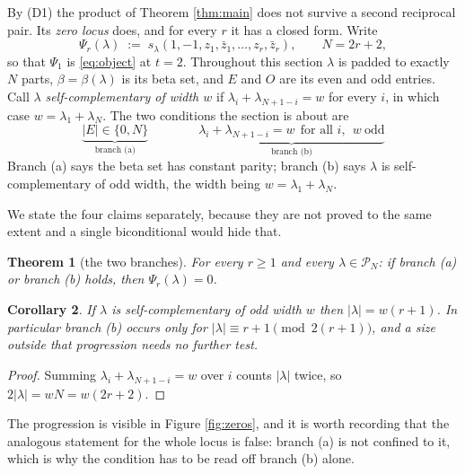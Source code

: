 \documentclass[11pt,reqno]{amsart}
\theoremstyle{plain}
\newtheorem{theorem}{Theorem}[section]
\newtheorem{corollary}[theorem]{Corollary}
\theoremstyle{definition}
\newcommand{\PP}{\mathcal{P}}
\begin{document}
By (D1) the product of Theorem \ref{thm:main} does not survive a second reciprocal pair. Its
\emph{zero locus} does, and for every $r$ it has a closed form. Write
\begin{equation}\label{eq:psir}
\Psi_r(\lambda)\;:=\;s_\lambda(1,-1,z_1,\bar z_1,\dots,z_r,\bar z_r),\qquad N=2r+2,
\end{equation}
so that $\Psi_1$ is \eqref{eq:object} at $t=2$. Throughout this section $\lambda$ is padded to
exactly $N$ parts, $\beta=\beta(\lambda)$ is its beta set, and $E$ and $O$ are its even and odd
entries. Call $\lambda$ \emph{self-complementary of width $w$} if $\lambda_i+\lambda_{N+1-i}=w$ for
every $i$, in which case $w=\lambda_1+\lambda_N$. The two conditions the section is about are
\begin{equation}\label{eq:branches}
\boxed{\;\;
\underbrace{|E|\in\{0,N\}}_{\text{branch (a)}}
\qquad\qquad
\underbrace{\lambda_i+\lambda_{N+1-i}=w\ \ \text{for all }i,\ \ w\ \text{odd}}_{\text{branch (b)}}
\;\;}
\end{equation}
Branch (a) says the beta set has constant parity; branch (b) says $\lambda$ is self-complementary of
odd width, the width being $w=\lambda_1+\lambda_N$.

We state the four claims separately, because they are not proved to the same extent and a single
biconditional would hide that.

\begin{theorem}[the two branches]\label{thm:zeros}
For every $r\ge1$ and every $\lambda\in\PP_N$: if branch {\rm(a)} or branch {\rm(b)} holds, then
$\Psi_r(\lambda)=0$.
\end{theorem}

\begin{corollary}\label{cor:sizes}
If $\lambda$ is self-complementary of odd width $w$ then $|\lambda|=w(r+1)$. In particular branch
{\rm(b)} occurs only for $|\lambda|\equiv r+1 \pmod{2(r+1)}$, and a size outside that progression
needs no further test.
\end{corollary}

\begin{proof}
Summing $\lambda_i+\lambda_{N+1-i}=w$ over $i$ counts $|\lambda|$ twice, so $2|\lambda|=wN=w(2r+2)$.
\end{proof}

The progression is visible in Figure \ref{fig:zeros}, and it is worth recording that the analogous
statement for the whole locus is false: branch (a) is not confined to it, which is why the condition
has to be read off branch (b) alone.
\end{document}
